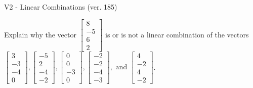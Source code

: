\begin{exercise}
  \begin{exerciseTitle}V2 - Linear Combinations (ver. 185)\end{exerciseTitle}
  \begin{exerciseStatement}
    Explain why the vector \(\left[\begin{array}{c}
8 \\
-5 \\
6 \\
2
\end{array}\right]\)  is or is not a linear 
	combination of the vectors \(\left[\begin{array}{c}
3 \\
-3 \\
-4 \\
0
\end{array}\right] , \left[\begin{array}{c}
-5 \\
2 \\
-4 \\
-2
\end{array}\right] , \left[\begin{array}{c}
0 \\
0 \\
-3 \\
0
\end{array}\right] , \left[\begin{array}{c}
-2 \\
-2 \\
-4 \\
-3
\end{array}\right] , \text{ and } \left[\begin{array}{c}
4 \\
-2 \\
4 \\
-2
\end{array}\right]\).
	



\end{exerciseStatement}
\end{exercise}
